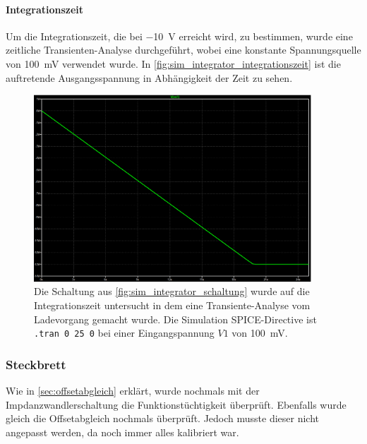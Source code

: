 \documentclass[12pt,english,ngerman]{scrartcl}
\begin{document}
\paragraph{Integrationszeit}
Um die Integrationszeit, die bei \SI{-10}{\volt} erreicht wird, zu bestimmen,
wurde eine zeitliche Transienten-Analyse durchgeführt, wobei eine konstante
Spannungsquelle von \SI{100}{\milli\volt} verwendet wurde. In
\autoref{fig:sim_integrator_integrationszeit} ist die auftretende
Ausgangsspannung in Abhängigkeit der Zeit zu sehen.


\begin{figure}[H]
  \centering
    \includegraphics[width=\linewidth, height=7cm]{./figures/integrator/sim/umkehr_int/dauer_aussteu.png}
  \caption{Die Schaltung aus \autoref{fig:sim_integrator_schaltung} wurde auf
  die Integrationszeit untersucht in dem eine Transiente-Analyse vom
  Ladevorgang gemacht wurde. Die Simulation SPICE-Directive ist \texttt{.tran 0 25 0} 
  bei einer Eingangspannung $V1$ von \SI{100}{\milli\volt}.}
  \label{fig:sim_integrator_integrationszeit}
\end{figure}

\subsubsection{Steckbrett}
Wie in \autoref{sec:offsetabgleich} erklärt, wurde nochmals mit der
Impdanzwandlerschaltung die Funktionstüchtigkeit überprüft. Ebenfalls wurde
gleich die Offsetabgleich nochmals überprüft. Jedoch musste dieser nicht
angepasst werden, da noch immer alles kalibriert war.
\end{document}
